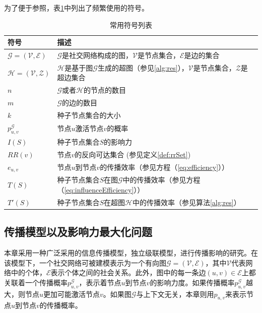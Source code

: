 为了便于参照，表\ref{3tab:notation}中列出了频繁使用的符号。

\begin{table}[ht]
\centering
\caption{常用符号列表}
\begin{tabular}{|p{2cm}|p{10cm}|}
\hline
\textbf{符号} & \textbf{描述} \\
\hline
$\mathcal{G}=\left(\mathcal{V},\mathcal{E}\right)$ & $\mathcal{G}$是社交网络构成的图，$\mathcal{V}$是节点集合，$\mathcal{E}$是边的集合\\
\hline
$\mathcal{H}=\left(\mathcal{V},\mathcal{Z}\right)$ & $\mathcal{H}$是基于图$\mathcal{G}$生成的超图（参见\ref{alg:res}），$\mathcal{V}$是节点集合，$\mathcal{Z}$是超边集合\\
\hline
$n$ & $\mathcal{G}$或者$\mathcal{H}$的节点的数目 \\
\hline
$m$ & $\mathcal{G}$的边的数目 \\
\hline
$k$ & 种子节点集合的大小 \\
\hline
$p^\mathcal{G}_{u,v}$ & 节点$u$激活节点$v$的概率 \\
\hline
$I\left(S\right)$ & 种子节点集合$S$的影响力 \\
\hline
$RR\left(v\right)$ & 节点$v$的反向可达集合 (参见定义\ref{def:rrSet}) \\
\hline
$e_{u,v}$ & 节点$u$到节点$v$的传播效率（参见方程（\ref{eq:efficiency}）） \\
\hline
$T\left(S\right)$ & 种子节点集合$S$在图$\mathcal{G}$中的传播效率（参见方程（\ref{eq:influenceEfficiency}））\\
\hline
$T'\left(S\right)$ & 种子节点集合$S$在超图$\mathcal{H}$中的传播效率（参见算法\ref{alg:res}）\\
\hline
\end{tabular}
\label{3tab:notation}
\end{table}

\subsection{传播模型以及影响力最大化问题}
\label{3subsec:model}
本章采用一种广泛采用的信息传播模型，独立级联模型，进行传播影响的研究。在该模型下，一个社交网络可被建模表示为一个有向图$\mathcal{G}=\left(\mathcal{V},\mathcal{E}\right)$，其中$\mathcal{V}$代表网络中的个体，$\mathcal{E}$表示个体之间的社会关系。此外，图中的每一条边$\left(u, v\right) \in \mathcal{E}$上都关联着一个传播概率$p^\mathcal{G}_{u,v}$，表示着节点$u$到节点$v$的影响力度。如果传播概率$p^\mathcal{G}_{u,v}$越大，则节点$u$更加可能激活节点$v$。如果图$\mathcal{G}$与上下文无关，本章则用$p_{u,v}$来表示节点$u$到节点$v$的传播概率。

